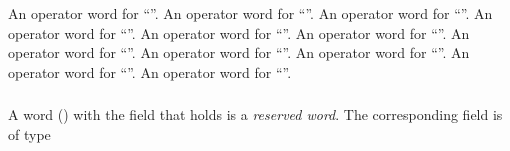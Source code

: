    An operator word for ``\code{|=}''.
   An operator word for ``\code{\^=}''.
   An operator word for ``\code{<<=}''.
   An operator word for ``\code{>>=}''.
   An operator word for ``\code{\&\&}''.
   An operator word for ``\code{||}''.
   An operator word for ``''.
   An operator word for ``''.
   An operator word for ``\code{->}''.
   An operator word for ``''.
   An operator word for ``\code{->*}''.


\subsubsection{}
\label{sec:ifc:WordSort:Keyword}

A word ()  with the  field that holds
 is a \emph{reserved word}.  The corresponding 
 field is of type 

